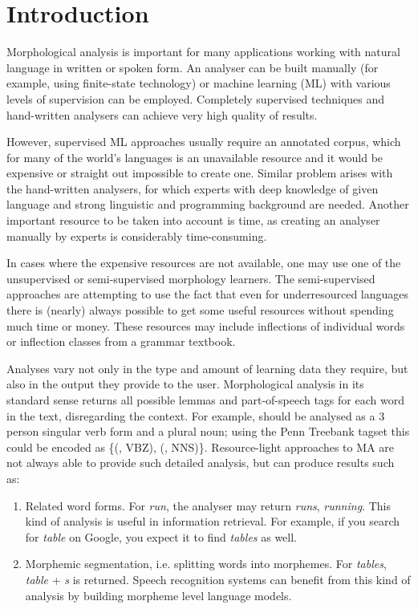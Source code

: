 \chapter{Introduction}

Morphological analysis is important for many applications working with natural language in written or spoken form. An analyser can be built manually (for example, using finite-state technology) or machine learning (ML) with various levels of supervision can be employed. Completely supervised techniques and hand-written analysers can achieve very high quality of results. 

However, supervised ML approaches usually require an annotated corpus, which for many of the world's languages is an unavailable resource and it would be expensive or straight out impossible to create one. Similar problem arises with the hand-written analysers, for which experts with deep knowledge of given language and strong linguistic and programming background are needed. Another important resource to be taken into account is time, as creating an analyser manually by experts is considerably time-consuming.

In cases where the expensive resources are not available, one may use one of the unsupervised or semi-supervised morphology learners. The semi-supervised approaches are attempting to use the fact that even for underresourced languages there is (nearly) always possible to get some useful resources without spending much time or money. These resources may include inflections of individual words or inflection classes from a grammar textbook. 
 
Analyses vary not only in the type and amount of learning data they require, but also in the output they provide to the user. Morphological analysis in its standard sense returns all possible lemmas and part-of-speech tags for each word in the text, disregarding the context. For example,  should be analysed as a 3 person singular verb form and a plural noun; using the Penn Treebank tagset \citep{marcus93} this could be encoded as \{(, VBZ), (, NNS)\}. Resource-light approaches to MA are not always able to provide such detailed analysis, but can produce results such as:

 \begin{enumerate}
\item Related word forms. For \emph{run}, the analyser may return \emph{runs}, \emph{running}. This kind of analysis is useful in information retrieval. For example, if you search for \emph{table} on Google, you expect it to find  \emph{tables} as well.
\item Morphemic segmentation, i.e. splitting words into morphemes. For \emph{tables},  \emph{table} + \emph{s} is returned. Speech recognition systems can benefit from this kind of analysis by building morpheme level language models.
\end{enumerate}

